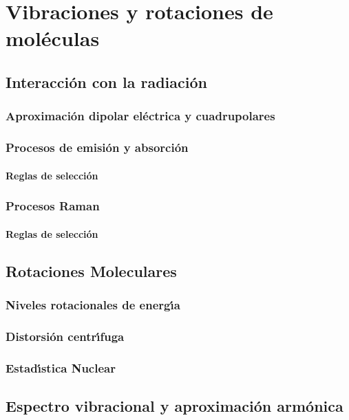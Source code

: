 
\chapter{Vibraciones y rotaciones de mol\'{e}culas}
\label{C:vibr-rotac-molec}

\section{Interacci\'{o}n con la radiaci\'{o}n}
\label{S:interaccion-con-radiacion}

\subsection{Aproximaci\'{o}n dipolar el\'{e}ctrica y cuadrupolares}
\label{S:aprox-dipol-electr}


\subsection{Procesos de emisi\'{o}n y absorci\'{o}n}
\label{S:procesos-de-emision}

\subsubsection{Reglas de selecci\'{o}n}
\label{S:reglas-de-seleccion-absorc}


\subsection{Procesos Raman}
\label{S:procesos-raman}

\subsubsection{Reglas de selecci\'{o}n}
\label{S:reglas-de-seleccion-raman}

\section{Rotaciones Moleculares}
\label{S:rotac-molec}

\subsection{Niveles rotacionales de energ\'{\i}a}
\label{S:nivel-rotac-energ}

\subsection{Distorsi\'{o}n centr\'{\i}fuga}
\label{S:dist-centr}

\subsection{Estad\'{\i}stica Nuclear}
\label{S:estadistica-nuclear}



\section{Espectro vibracional y aproximaci\'{o}n arm\'{o}nica}
\label{S:espectro-vibr-armon}

